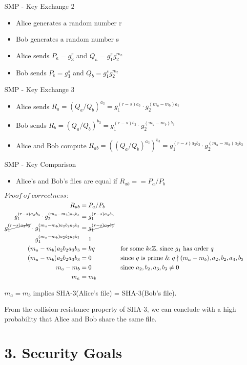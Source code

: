 \documentclass{article}
\begin{document}
SMP - Key Exchange 2
\begin{itemize}
  \item Alice generates a random number r
  \item Bob generates a random number s
  \item Alice sends $P_a = g_3^r$ and $Q_a = g_1^rg_2^{m_a}$
  \item Bob sends $P_b = g_3^s$ and $Q_b = g_1^sg_2^{m_b}$
\end{itemize}

SMP - Key Exchange 3
\begin{itemize}
  \item Alice sends $R_a = (Q_a/Q_b)^{a_3} = g_1^{(r-s)a_3}\cdot g_2^{(m_a-m_b)a_3}$
  \item Bob sends $R_b = (Q_a/Q_b)^{b_3} = g_1^{(r-s)b_3}\cdot g_2^{(m_a-m_b)b_3}$
  \item Alice and Bob compute $R_{ab} = ((Q_a/Q_b)^{a_3})^{b_3} = 
  g_1^{(r-s)a_3b_3} \cdot g_2^{(m_a-m_b)a_3b_3}$
\end{itemize}
SMP - Key Comparison
\begin{itemize}
  \item Alice's and Bob's files are equal if $R_{ab} == P_a / P_b$
\end{itemize}

$Proof\ of\ correctness:$
\begin{align*}
  R_{ab} &= P_a / P_b\\
  g_1^{(r-s)a_3b_3} \cdot g_2^{(m_a-m_b)a_3b_3} &= g_1^{(r-s)a_3b_3}\\
  \cancel{g_1^{(r-s)a_3b_3}} \cdot g_1^{(m_a-m_b)a_2b_2a_3b_3} &= \cancel{g_1^{(r-s)a_3b_3}}\\
  g_1^{(m_a-m_b)a_2b_2a_3b_3} &= 1\\
  (m_a-m_b)a_2b_2a_3b_3 &= kq && \text{for some $k \epsilon \mathbb{Z}$, since $g_1$ has order $q$}\\
  (m_a-m_b)a_2b_2a_3b_3 &= 0 && \text{since $q$ is prime \&\ } q \nmid (m_a-m_b), a_2, b_2,a_3, b_3\\
  m_a - m_b &= 0 &&\text{since $a_2, b_2, a_3, b_3 \neq 0$}\\
  m_a &= m_b
\end{align*}

$m_a = m_b$ implies SHA-3(Alice's file) = SHA-3(Bob's file).

From the collision-resistance property of SHA-3, we can conclude with a high probability 
that Alice and Bob share the same file.

\section*{3. Security Goals}
\end{document}
